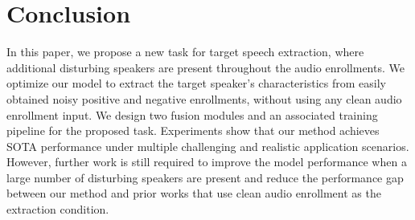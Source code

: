 \section{Conclusion}

In this paper, we propose a new task for target speech extraction, where additional disturbing speakers are present throughout the audio enrollments. We optimize our model to extract the target speaker's characteristics from easily obtained noisy positive and negative enrollments, without using any clean audio enrollment input. 
We design two fusion modules and an associated training pipeline for the proposed task. Experiments show that our method achieves SOTA performance under multiple challenging and realistic application scenarios. However, further work is still required to improve the model performance when a large number of disturbing speakers are present and reduce the performance gap between our method and prior works that use clean audio enrollment as the extraction condition. 






